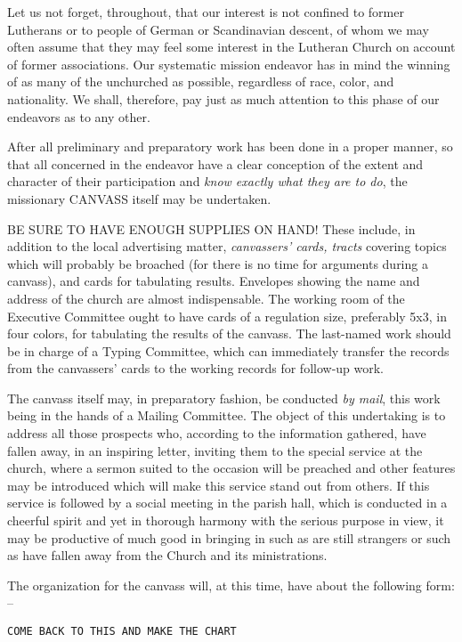 \documentclass[
]{book}
\begin{document}
Let us not forget, throughout, that our interest is not confined to former Lutherans or to people of German or Scandinavian descent, of whom we may often assume that they may feel some interest in the Lutheran Church on account of former associations. Our systematic mission endeavor has in mind the winning of as many of the unchurched as possible, regardless of race, color, and nationality. We shall, therefore, pay just as much attention to this phase of our endeavors as to any other.

After all preliminary and preparatory work has been done in a proper manner, so that all concerned in the endeavor have a clear conception of the extent and character of their participation and \emph{know exactly what they are to do}, the missionary CANVASS itself may be undertaken.

BE SURE TO HAVE ENOUGH SUPPLIES ON HAND! These include, in addition to the local advertising matter, \emph{canvassers' cards, tracts} covering topics which will probably be broached (for there is no time for arguments during a canvass), and cards for tabulating results. Envelopes showing the name and address of the church are almost indispensable. The working room of the Executive Committee ought to have cards of a regulation size, preferably 5x3, in four colors, for tabulating the results of the canvass. The last-named work should be in charge of a Typing Committee, which can immediately transfer the records from the canvassers' cards to the working records for follow-up work.

The canvass itself may, in preparatory fashion, be conducted \emph{by mail}, this work being in the hands of a Mailing Committee. The object of this undertaking is to address all those prospects who, according to the information gathered, have fallen away, in an inspiring letter, inviting them to the special service at the church, where a sermon suited to the occasion will be preached and other features may be introduced which will make this service stand out from others. If this service is followed by a social meeting in the parish hall, which is conducted in a cheerful spirit and yet in thorough harmony with the serious purpose in view, it may be productive of much good in bringing in such as are still strangers or such as have fallen away from the Church and its ministrations.

The organization for the canvass will, at this time, have about the following form: --

\begin{verbatim}
COME BACK TO THIS AND MAKE THE CHART
\end{verbatim}
\end{document}
